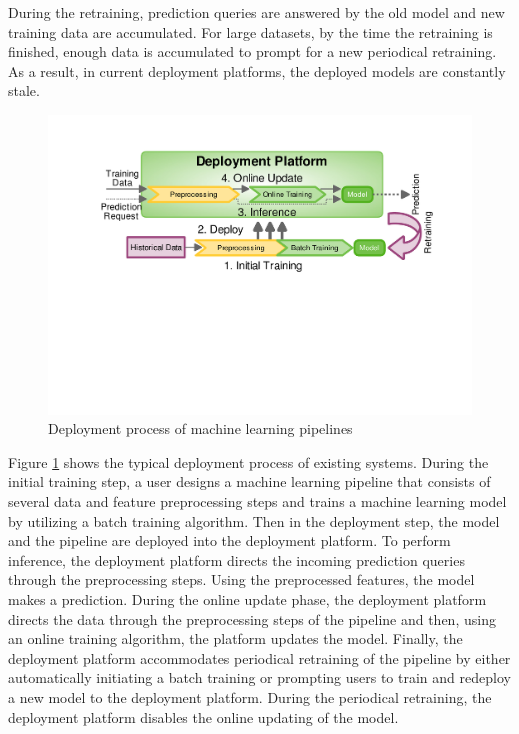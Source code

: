 During the retraining, prediction queries are answered by the old model and new training data are accumulated.
For large datasets, by the time the retraining is finished, enough data is accumulated to prompt for a new periodical retraining.
As a result, in current deployment platforms, the deployed models are constantly stale.

\begin{figure}[h!]
\centering
\includegraphics[width=\columnwidth]{../images/generic-motivational-example-v2.pdf}
\caption{Deployment process of machine learning pipelines}
\label{fig:motivational-example}
\end{figure}

Figure \ref{fig:motivational-example} shows the typical deployment process of existing systems.
During the initial training step, a user designs a machine learning pipeline that consists of several data and feature preprocessing steps and trains a machine learning model by utilizing a batch training algorithm.
Then in the deployment step, the model and the pipeline are deployed into the deployment platform.
To perform inference, the deployment platform directs the incoming prediction queries through the preprocessing steps.
Using the preprocessed features, the model makes a prediction.
During the online update phase, the deployment platform directs the data through the preprocessing steps of the pipeline and then, using an online training algorithm, the platform updates the model.
Finally, the deployment platform accommodates periodical retraining of the pipeline by either automatically initiating a batch training or prompting users to train and redeploy a new model to the deployment platform.
During the periodical retraining, the deployment platform disables the online updating of the model.

